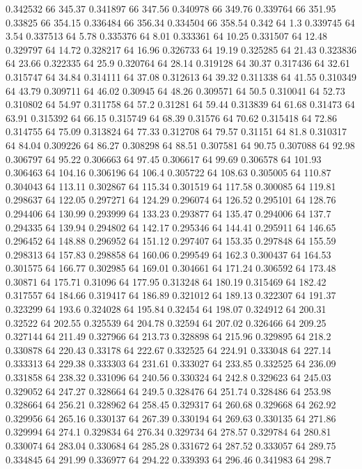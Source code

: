 0.342532 66 345.37
0.341897 66 347.56
0.340978 66 349.76
0.339764 66 351.95
0.33825 66 354.15
0.336484 66 356.34
0.334504 66 358.54
0.342 64 1.3
0.339745 64 3.54
0.337513 64 5.78
0.335376 64 8.01
0.333361 64 10.25
0.331507 64 12.48
0.329797 64 14.72
0.328217 64 16.96
0.326733 64 19.19
0.325285 64 21.43
0.323836 64 23.66
0.322335 64 25.9
0.320764 64 28.14
0.319128 64 30.37
0.317436 64 32.61
0.315747 64 34.84
0.314111 64 37.08
0.312613 64 39.32
0.311338 64 41.55
0.310349 64 43.79
0.309711 64 46.02
0.30945 64 48.26
0.309571 64 50.5
0.310041 64 52.73
0.310802 64 54.97
0.311758 64 57.2
0.31281 64 59.44
0.313839 64 61.68
0.31473 64 63.91
0.315392 64 66.15
0.315749 64 68.39
0.31576 64 70.62
0.315418 64 72.86
0.314755 64 75.09
0.313824 64 77.33
0.312708 64 79.57
0.31151 64 81.8
0.310317 64 84.04
0.309226 64 86.27
0.308298 64 88.51
0.307581 64 90.75
0.307088 64 92.98
0.306797 64 95.22
0.306663 64 97.45
0.306617 64 99.69
0.306578 64 101.93
0.306463 64 104.16
0.306196 64 106.4
0.305722 64 108.63
0.305005 64 110.87
0.304043 64 113.11
0.302867 64 115.34
0.301519 64 117.58
0.300085 64 119.81
0.298637 64 122.05
0.297271 64 124.29
0.296074 64 126.52
0.295101 64 128.76
0.294406 64 130.99
0.293999 64 133.23
0.293877 64 135.47
0.294006 64 137.7
0.294335 64 139.94
0.294802 64 142.17
0.295346 64 144.41
0.295911 64 146.65
0.296452 64 148.88
0.296952 64 151.12
0.297407 64 153.35
0.297848 64 155.59
0.298313 64 157.83
0.298858 64 160.06
0.299549 64 162.3
0.300437 64 164.53
0.301575 64 166.77
0.302985 64 169.01
0.304661 64 171.24
0.306592 64 173.48
0.30871 64 175.71
0.31096 64 177.95
0.313248 64 180.19
0.315469 64 182.42
0.317557 64 184.66
0.319417 64 186.89
0.321012 64 189.13
0.322307 64 191.37
0.323299 64 193.6
0.324028 64 195.84
0.32454 64 198.07
0.324912 64 200.31
0.32522 64 202.55
0.325539 64 204.78
0.32594 64 207.02
0.326466 64 209.25
0.327144 64 211.49
0.327966 64 213.73
0.328898 64 215.96
0.329895 64 218.2
0.330878 64 220.43
0.33178 64 222.67
0.332525 64 224.91
0.333048 64 227.14
0.333313 64 229.38
0.333303 64 231.61
0.333027 64 233.85
0.332525 64 236.09
0.331858 64 238.32
0.331096 64 240.56
0.330324 64 242.8
0.329623 64 245.03
0.329052 64 247.27
0.328664 64 249.5
0.328476 64 251.74
0.328486 64 253.98
0.328664 64 256.21
0.328962 64 258.45
0.329317 64 260.68
0.329668 64 262.92
0.329956 64 265.16
0.330137 64 267.39
0.330194 64 269.63
0.330135 64 271.86
0.329994 64 274.1
0.329834 64 276.34
0.329734 64 278.57
0.329784 64 280.81
0.330074 64 283.04
0.330684 64 285.28
0.331672 64 287.52
0.333057 64 289.75
0.334845 64 291.99
0.336977 64 294.22
0.339393 64 296.46
0.341983 64 298.7
